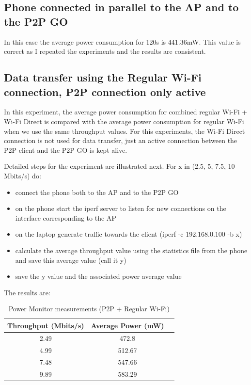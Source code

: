 
\subsection{Phone connected in parallel to the AP and to the P2P GO}
\label{sub-sec:app2p-parallel}
In this case the average power consumption for 120s is 441.36mW. This value is correct as I repeated the experiments and the results are consistent.


\subsection{Data transfer using the Regular Wi-Fi connection, P2P connection only active}
\label{sub-sec:transfer-parallel}

In this experiment, the average power consumption for combined regular Wi-Fi + Wi-Fi Direct is compared with the average power consumption for regular Wi-Fi when we use the same throughput values. For this experiments, the Wi-Fi Direct connection is not used for data transfer, just an active connection between the P2P client and the P2P GO is kept alive. 

Detailed steps for the experiment are illustrated next. For x in (2.5, 5, 7.5, 10 Mbits/s) do:
\begin{itemize}
  \item connect the phone both to the AP and to the P2P GO
  \item on the phone start the iperf server to listen for new connections on the interface corresponding to the AP
  \item on the laptop generate traffic towards the client (iperf -c 192.168.0.100 -b x)
  \item calculate the average throughput value using the statistics file from the phone and save this average value (call it y)
  \item save the y value and the associated power average value
\end{itemize}

The results are:

\begin{table}[h!]
  \centering
  \caption{Power Monitor measurements (P2P + Regular Wi-Fi)}
  \label{tab:table1}
  \begin{tabular}{ccc}
    \toprule
    Throughput (Mbits/s) & Average Power (mW) \\
    \midrule
    2.49 & 472.8\\
    4.99 & 512.67\\
    7.48 & 547.66\\
    9.89 & 583.29\\
    \bottomrule
  \end{tabular}
\end{table}

